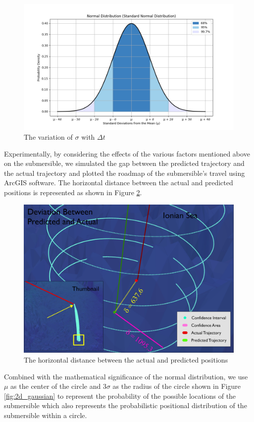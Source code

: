 \documentclass[12pt]{article}
\begin{document}
\begin{figure}[h!]
    \centering
    \includegraphics[width=.6\textwidth]{fig/variation_sigma.jpg}
    \caption{The variation of $\sigma$ with $\Delta t$}
    \label{fig:variation_sigma}
\end{figure}

Experimentally, by considering the effects of the various factors mentioned above on the submersible, we simulated the gap between the predicted trajectory and the actual trajectory and plotted the roadmap of the submersible's travel using ArcGIS software. The horizontal distance between the actual and predicted positions is represented as shown in Figure \ref{fig:trajectory}.

\begin{figure}[h!]
    \centering
    \includegraphics[width=.5\textwidth]{fig/trajectory.jpg}
    \caption{The horizontal distance between the actual and predicted positions}
    \label{fig:trajectory}
\end{figure}

Combined with the mathematical significance of the normal distribution, we use $\mu$ as the center of the circle and $3\sigma$ as the radius of the circle shown in Figure \ref{fig:2d_gaussian} to represent the probability of the possible locations of the submersible which also represents the probabilistic positional distribution of the submersible within a circle.
\end{document}

